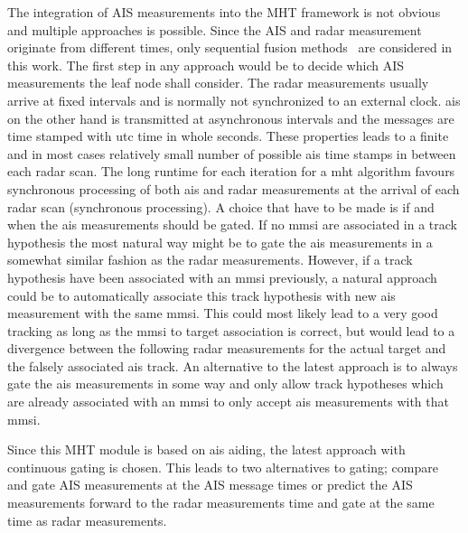 The integration of AIS measurements into the MHT framework is not obvious and multiple approaches is possible. Since the AIS and radar measurement originate from different times, only sequential fusion methods~\cite{Bar-Shalom1995} are considered in this work. The first step in any approach would be to decide which AIS measurements the leaf node shall consider. The radar measurements usually arrive at fixed intervals and is normally not synchronized to an external clock. \gls{ais} on the other hand is transmitted at asynchronous intervals and the messages are time stamped with \gls{utc} time in whole seconds. These properties leads to a finite and in most cases relatively small number of possible \gls{ais} time stamps in between each radar scan. The long runtime for each iteration for a \gls{mht} algorithm favours synchronous processing of both \gls{ais} and \gls{radar} measurements at the arrival of each radar scan (synchronous processing). A choice that have to be made is if and when the \gls{ais} measurements should be gated. If no \gls{mmsi} are associated in a track hypothesis the most natural way might be to gate the \gls{ais} measurements in a somewhat similar fashion as the radar measurements. However, if a track hypothesis have been associated with an \gls{mmsi} previously, a natural approach could be to automatically associate this track hypothesis with new \gls{ais} measurement with the same \gls{mmsi}. This could most likely lead to a very good tracking as long as the \gls{mmsi} to target association is correct, but would lead to a divergence between the following radar measurements for the actual target and the falsely  associated \gls{ais} track. An alternative to the latest approach is to always gate the \gls{ais} measurements in some way and only allow track hypotheses which are already associated with an \gls{mmsi} to only accept \gls{ais} measurements with that \gls{mmsi}.

Since this MHT module is based on \gls{ais} aiding, the latest approach with continuous gating is chosen. This leads to two alternatives to gating; compare and gate AIS measurements at the AIS message times or predict the AIS measurements forward to the radar measurements time and gate at the same time as radar measurements.

